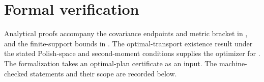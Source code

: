 \clearpage
\section{Formal verification}\label{sec:lean-proofs}

Analytical proofs accompany the covariance endpoints and metric bracket in
, and the finite-support bounds in
.
The optimal-transport existence result under the stated Polish-space and
second-moment conditions supplies the optimizer for
 \citep[Ch.~1]{panaretos_invitation_2020}.
The formalization takes an optimal-plan certificate as an input.
The machine-checked statements and their scope are recorded below.

\ppLeanStatusList
